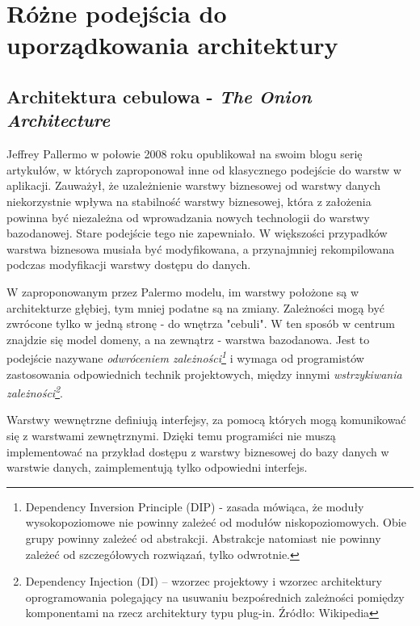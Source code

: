 \section{Różne podejścia do uporządkowania architektury}
\subsection{Architektura cebulowa - \textit{The Onion Architecture}}
Jeffrey Pallermo w połowie 2008 roku opublikował na swoim blogu serię artykułów\cite{website:architect:onion}, w których zaproponował inne od klasycznego podejście do warstw w aplikacji. Zauważył, że uzależnienie warstwy biznesowej od warstwy danych niekorzystnie wpływa na stabilność warstwy biznesowej, która z założenia powinna być niezależna od wprowadzania nowych technologii do warstwy bazodanowej. Stare podejście tego nie zapewniało. W większości przypadków warstwa biznesowa musiała być modyfikowana, a przynajmniej rekompilowana podczas modyfikacji warstwy dostępu do danych.

W zaproponowanym przez Palermo modelu, im warstwy położone są w architekturze głębiej, tym mniej podatne są na zmiany. Zależności mogą być zwrócone tylko w jedną stronę - do wnętrza "cebuli". W ten sposób w centrum znajdzie się model domeny, a na zewnątrz - warstwa bazodanowa. Jest to podejście nazywane \textit{odwróceniem zależności\footnote{Dependency Inversion Principle (DIP) - zasada mówiąca, że moduły wysokopoziomowe nie powinny zależeć od modułów niskopoziomowych. Obie grupy powinny zależeć od abstrakcji. Abstrakcje natomiast nie powinny zależeć od szczegółowych rozwiązań, tylko odwrotnie.}} i wymaga od programistów zastosowania odpowiednich technik projektowych, między innymi \textit{wstrzykiwania zależności\footnote{Dependency Injection (DI) – wzorzec projektowy i wzorzec architektury oprogramowania polegający na usuwaniu bezpośrednich zależności pomiędzy komponentami na rzecz architektury typu plug-in. Źródło: Wikipedia}}.

Warstwy wewnętrzne definiują interfejsy, za pomocą których mogą komunikować się z warstwami zewnętrznymi. Dzięki temu programiści nie muszą implementować na przykład dostępu z warstwy biznesowej do bazy danych w warstwie danych, zaimplementują tylko odpowiedni interfejs.

